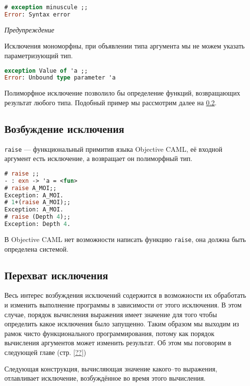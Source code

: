 \begin{lstlisting}[language=OCaml]
# exception minuscule ;;
Error: Syntax error
\end{lstlisting}

{\it Предупреждение}

Исключения мономорфны, при объявлении типа аргумента мы не можем указать
параметризующий тип.

\begin{lstlisting}[language=OCaml]
exception Value of 'a ;;
Error: Unbound type parameter 'a
\end{lstlisting}

Полиморфное исключение позволило бы определение функций, возвращающих результат
любого типа. Подобный пример мы рассмотрим далее на \ref{}.

\subsection{Возбуждение исключения}

\texttt{raise} --- функциональный примитив языка Objective CAML, её входной
аргумент есть исключение, а возвращает он полиморфный тип.

\begin{lstlisting}[language=OCaml]
# raise ;;
- : exn -> 'a = <fun>
# raise A_MOI;;
Exception: A_MOI.
# 1+(raise A_MOI);;
Exception: A_MOI.
# raise (Depth 4);;
Exception: Depth 4.
\end{lstlisting}

В Objective CAML нет возможности написать функцию \texttt{raise}, она должна
быть определена системой.

\subsection{Перехват исключения}

Весь интерес возбуждения исключений содержится в возможности их обработать и
изменить выполнение программы в зависимости от этого исключения. В этом случае,
порядок вычисления выражения имеет значение для того чтобы определить какое
исключения было запущенно. Таким образом мы выходим из рамок чисто
функционального программирования, потому как порядок вычисления аргументов может
изменить результат. Об этом мы поговорим в следующей главе (стр. \ref{??})

Следующая конструкция, вычисляющая значение какого--то выражения, отлавливает
исключение, возбуждённое во время этого вычисления.

